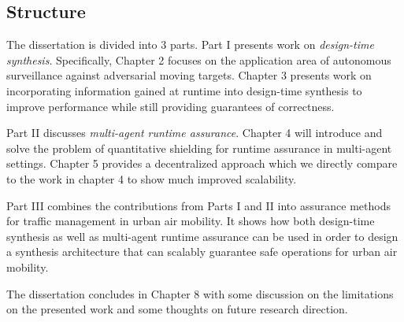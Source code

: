 \subsection{Structure}

The dissertation is divided into 3 parts. Part I presents work on \emph{design-time synthesis}. Specifically, Chapter 2 focuses on the application area of autonomous surveillance against adversarial moving targets. Chapter 3 presents work on incorporating information gained at runtime into design-time synthesis to improve performance while still providing guarantees of correctness. 

Part II discusses \emph{multi-agent runtime assurance}. Chapter 4 will introduce and solve the problem of quantitative shielding for runtime assurance in multi-agent settings. Chapter 5 provides a decentralized approach which we directly compare to the work in chapter 4 to show much improved scalability. 

Part III combines the contributions from Parts I and II into assurance methods for traffic management in urban air mobility. It shows how both design-time synthesis as well as multi-agent runtime assurance can be used in order to design a synthesis architecture that can scalably guarantee safe operations for urban air mobility. 

The dissertation concludes in Chapter 8 with some discussion on the limitations on the presented work and some thoughts on future research direction. 



